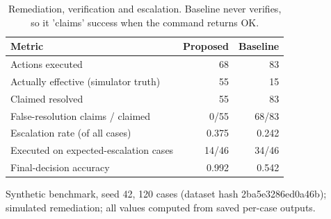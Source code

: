 \begin{table}[t]
\centering
\caption{Remediation, verification and escalation. Baseline never verifies, so it 'claims' success when the command returns OK.}
\label{tab:remed}
\begin{tabular}{lrr}
\toprule
Metric & Proposed & Baseline \\
\midrule
Actions executed & 68 & 83 \\
Actually effective (simulator truth) & 55 & 15 \\
Claimed resolved & 55 & 83 \\
False-resolution claims / claimed & 0/55 & 68/83 \\
Escalation rate (of all cases) & 0.375 & 0.242 \\
Executed on expected-escalation cases & 14/46 & 34/46 \\
Final-decision accuracy & 0.992 & 0.542 \\
\bottomrule
\end{tabular}
\par\footnotesize Synthetic benchmark, seed 42, 120 cases (dataset hash 2ba5e3286ed0a46b); simulated remediation; all values computed from saved per-case outputs.
\end{table}

